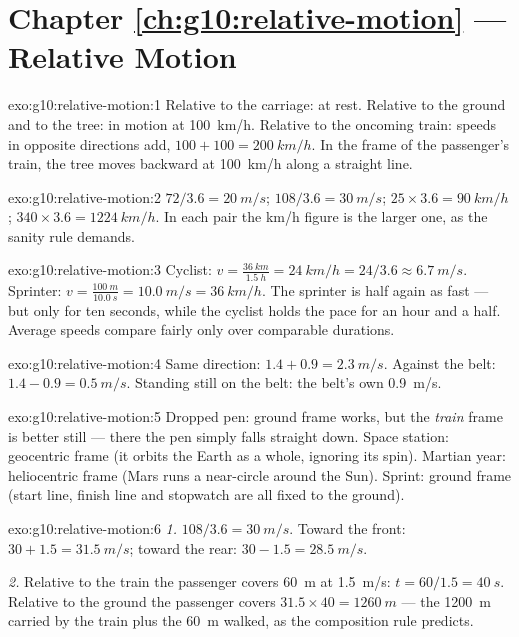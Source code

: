 \section*{Chapter \ref{ch:g10:relative-motion} --- Relative Motion}

\begin{solution}{exo:g10:relative-motion:1}
Relative to the carriage: at rest. Relative to the ground and to the
tree: in motion at \qty{100}{km/h}. Relative to the oncoming train:
speeds in opposite directions add, $100 + 100 = \qty{200}{km/h}$. In the
frame of the passenger's train, the tree moves backward at
\qty{100}{km/h} along a straight line.
\end{solution}

\begin{solution}{exo:g10:relative-motion:2}
$72 / 3.6 = \qty{20}{m/s}$; $108 / 3.6 = \qty{30}{m/s}$;
$25 \times 3.6 = \qty{90}{km/h}$; $340 \times 3.6 = \qty{1224}{km/h}$.
In each pair the \unit{km/h} figure is the larger one, as the sanity
rule demands.
\end{solution}

\begin{solution}{exo:g10:relative-motion:3}
Cyclist: $v = \frac{\qty{36}{km}}{\qty{1.5}{h}} = \qty{24}{km/h}
= 24/3.6 \approx \qty{6.7}{m/s}$. Sprinter:
$v = \frac{\qty{100}{m}}{\qty{10.0}{s}} = \qty{10.0}{m/s}
= \qty{36}{km/h}$. The sprinter is half again as fast --- but only for
ten seconds, while the cyclist holds the pace for an hour and a half.
Average speeds compare fairly only over comparable durations.
\end{solution}

\begin{solution}{exo:g10:relative-motion:4}
Same direction: $1.4 + 0.9 = \qty{2.3}{m/s}$. Against the belt:
$1.4 - 0.9 = \qty{0.5}{m/s}$. Standing still on the belt: the belt's own
\qty{0.9}{m/s}.
\end{solution}

\begin{solution}{exo:g10:relative-motion:5}
Dropped pen: ground frame works, but the \emph{train} frame is better
still --- there the pen simply falls straight down. Space station:
geocentric frame (it orbits the Earth as a whole, ignoring its spin).
Martian year: heliocentric frame (Mars runs a near-circle around the
Sun). Sprint: ground frame (start line, finish line and stopwatch are
all fixed to the ground).
\end{solution}

\begin{solution}{exo:g10:relative-motion:6}
\emph{1.} $108/3.6 = \qty{30}{m/s}$. Toward the front:
$30 + 1.5 = \qty{31.5}{m/s}$; toward the rear:
$30 - 1.5 = \qty{28.5}{m/s}$.

\emph{2.} Relative to the train the passenger covers \qty{60}{m} at
\qty{1.5}{m/s}: $t = 60/1.5 = \qty{40}{s}$. Relative to the ground the
passenger covers $31.5 \times 40 = \qty{1260}{m}$ --- the \qty{1200}{m}
carried by the train plus the \qty{60}{m} walked, as the composition
rule predicts.
\end{solution}

